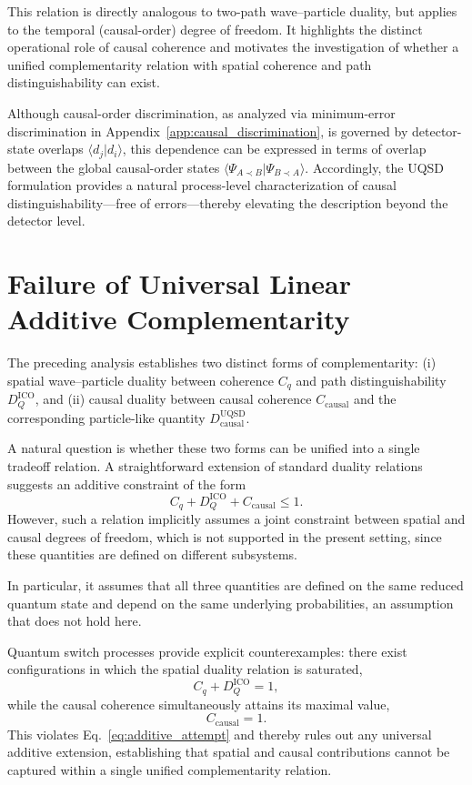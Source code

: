 \documentclass[aps,pra,reprint,superscriptaddress]{revtex4-2}
\begin{document}
This relation is directly analogous to two-path wave--particle duality, but applies to the temporal (causal-order) degree of freedom.
It highlights the distinct operational role of causal coherence and motivates the investigation of whether a unified complementarity relation with spatial coherence and path distinguishability can exist.

Although causal-order discrimination, as analyzed via minimum-error discrimination in Appendix~\ref{app:causal_discrimination},
is governed by detector-state overlaps $\langle d_j|d_i\rangle$, this dependence can be expressed in terms of overlap between the global causal-order states
$\langle \Psi_{A\prec B} | \Psi_{B\prec A} \rangle$.
Accordingly, the UQSD formulation provides a natural process-level characterization of causal distinguishability—free of errors—thereby elevating the description beyond the detector level.
\section{Failure of Universal Linear Additive Complementarity}
\label{sec:no_go}

The preceding analysis establishes two distinct forms of complementarity:
(i) spatial wave--particle duality between coherence $C_q$ and path distinguishability $D_Q^{\mathrm{ICO}}$, and 
(ii) causal duality between causal coherence $C_{\mathrm{causal}}$ and the corresponding particle-like quantity $D_{\mathrm{causal}}^{\mathrm{UQSD}}$.

A natural question is whether these two forms can be unified into a single tradeoff relation. A straightforward extension of standard duality relations suggests an additive constraint of the form
\begin{equation}
C_q + D_Q^{\mathrm{ICO}} + C_{\mathrm{causal}} \le 1.
\label{eq:additive_attempt}
\end{equation}
However, such a relation implicitly assumes a joint constraint between spatial and causal degrees of freedom, which is not supported in the present setting, since these quantities are defined on different subsystems.

In particular, it assumes that all three quantities are defined on the same reduced quantum state and depend on the same underlying probabilities, an assumption that does not hold here.

Quantum switch processes provide explicit counterexamples: there exist configurations in which the spatial duality relation is saturated,
\[
C_q + D_Q^{\mathrm{ICO}} = 1,
\]
while the causal coherence simultaneously attains its maximal value,
\[
C_{\mathrm{causal}} = 1.
\]
This violates Eq.~\eqref{eq:additive_attempt} and thereby rules out any universal additive extension, establishing that spatial and causal contributions cannot be captured within a single unified complementarity relation.
\end{document}
